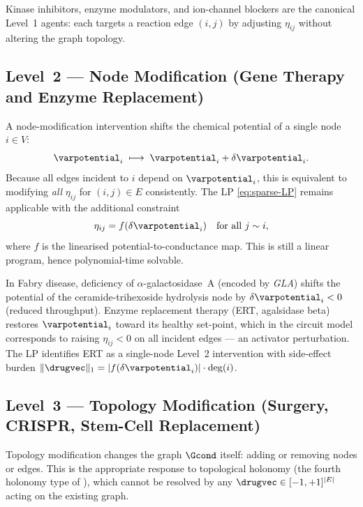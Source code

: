 Kinase inhibitors, enzyme modulators, and ion-channel blockers are the
canonical Level~1 agents: each targets a reaction edge $(i,j)$ by adjusting
$\eta_{ij}$ without altering the graph topology.

\subsection{Level~2 — Node Modification (Gene Therapy and Enzyme Replacement)}

A node-modification intervention shifts the chemical potential of a single
node $i \in V$:
\begin{equation}
  \varpotential_i \;\longmapsto\; \varpotential_i + \delta\varpotential_i.
  \label{eq:node-shift}
\end{equation}
Because all edges incident to $i$ depend on $\varpotential_i$, this is
equivalent to modifying \emph{all} $\eta_{ij}$ for $(i,j) \in E$ consistently.
The LP \eqref{eq:sparse-LP} remains applicable with the additional constraint
\begin{equation}
  \eta_{ij} = f(\delta\varpotential_i) \quad \text{for all } j \sim i,
  \label{eq:node-mod-constraint}
\end{equation}
where $f$ is the linearised potential-to-conductance map.  This is still a
linear program, hence polynomial-time solvable.

\begin{example}
\label{ex:fabry}
In Fabry disease, deficiency of $\alpha$-galactosidase~A (encoded by \textit{GLA})
shifts the potential of the ceramide-trihexoside hydrolysis node by
$\delta\varpotential_i < 0$ (reduced throughput).  Enzyme replacement therapy
(ERT, agalsidase beta) restores $\varpotential_i$ toward its healthy set-point,
which in the circuit model corresponds to raising $\eta_{ij} < 0$ on all
incident edges — an activator perturbation.  The LP identifies ERT as a
single-node Level~2 intervention with side-effect burden
$\|\drugvec\|_1 = |f(\delta\varpotential_i)| \cdot \deg(i)$.
\end{example}

\subsection{Level~3 — Topology Modification (Surgery, CRISPR, Stem-Cell Replacement)}

Topology modification changes the graph $\Gcond$ itself: adding or removing
nodes or edges.  This is the appropriate response to topological holonomy
(the fourth holonomy type of ), which cannot be
resolved by any $\drugvec \in [-1,+1]^{|E|}$ acting on the existing graph.


